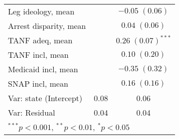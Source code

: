 \begin{table}
\begin{center}
\begin{tabular}{l c c }
Leg ideology, mean         &                         & $-0.05 \; (0.06)$      \\
Arrest disparity, mean     &                         & $0.04 \; (0.06)$       \\
TANF adeq, mean            &                         & $0.26 \; (0.07)^{***}$ \\
TANF incl, mean            &                         & $0.10 \; (0.20)$       \\
Medicaid incl, mean        &                         & $-0.35 \; (0.32)$      \\
SNAP incl, mean            &                         & $0.16 \; (0.16)$       \\
\hline
Var: state (Intercept)     & 0.08                    & 0.06                   \\
Var: Residual              & 0.04                    & 0.04                   \\
\hline
\multicolumn{3}{l}{\scriptsize{$^{***}p<0.001$, $^{**}p<0.01$, $^*p<0.05$}}
\end{tabular}
\label{table:coefficients}
\end{center}
\end{table}
